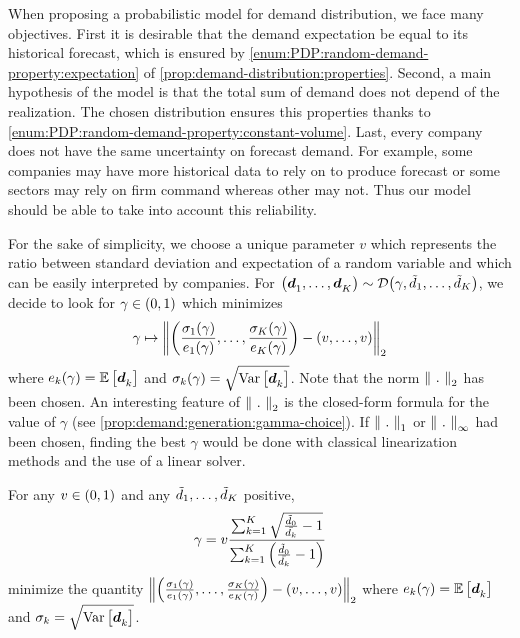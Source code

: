When proposing a probabilistic model for demand distribution, we face many objectives.
First it is desirable that the demand expectation be equal to its historical forecast, which is ensured by \cref{enum:PDP:random-demand-property:expectation} of \cref{prop:demand-distribution:properties}.
Second, a main hypothesis of the model is that the total sum of demand does not depend of the realization.
The chosen distribution ensures this properties thanks to \cref{enum:PDP:random-demand-property:constant-volume}.
Last, every company does not have the same uncertainty on forecast demand.
For example, some companies may have more historical data to rely on to produce forecast or some sectors may rely on firm command whereas other may not.
Thus our model should be able to take into account this reliability.


For the sake of simplicity, we choose a unique parameter $v$ which represents the ratio between standard deviation and expectation of a random variable and which can be easily interpreted by companies.
For $\bracket{\va\demand_1,\ldots,\va\demand_K}\sim\cD\bracket{\gamma,\tilde{\demand}_1,\ldots,\tilde{\demand}_K}$, we decide to look for $\gamma\in\bracket{0,1}$ which minimizes
\begin{equation}
  \gamma\mapsto\norm{\bracket{\frac{\sigma_1(\gamma)}{e_1(\gamma)},\ldots,\frac{\sigma_K(\gamma)}{e_K(\gamma)}}-\bracket{v,\ldots,v}}_2
\end{equation}
where $e_k(\gamma)=\espe\sqbracket{\va\demand_k}$ and $\sigma_k(\gamma)=\sqrt{\vari\sqbracket{\va\demand_k}}$.
Note that the norm $\norm{\ .\ }_2$ has been chosen.
An interesting feature of $\norm{\ .\ }_2$ is the closed-form formula for the value of $\gamma$ (see \cref{prop:demand:generation:gamma-choice}).
If $\norm{\ .\ }_1$ or $\norm{\ .\ }_{\infty}$ had been chosen, finding the best $\gamma$ would be done with classical linearization methods and the use of a linear solver.


\begin{prop}\label{prop:demand:generation:gamma-choice}
For any $v\in\bracket{0,1}$ and any $\tilde{d}_1,\ldots,\tilde{d}_K$ positive,
\begin{equation}
  \gamma
  =
  v\frac
  {\sum_{k=1}^K\sqrt{\frac{\tilde{\demand}_0}{\bar{\demand_k}}-1}}
  {\sum_{k=1}^K\bracket{\frac{\tilde{\demand}_0}{\bar{\demand_k}}-1}}
\end{equation}
minimize the quantity
$\norm{\bracket{\frac{\sigma_1(\gamma)}{e_1(\gamma)},\ldots,\frac{\sigma_K(\gamma)}{e_K(\gamma)}}-\bracket{v,\ldots,v}}_2$
where $e_k(\gamma)=\espe\sqbracket{\va\demand_k}$ and $\sigma_k=\sqrt{\vari\sqbracket{\va\demand_k}}$.
\end{prop}


